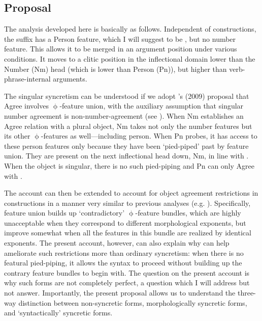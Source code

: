 \documentclass[output=paper,colorlinks,citecolor=brown,
]{langscibook}
\begin{document}
\subsection{Proposal}

The analysis developed here is basically as follows. Independent of \datnom constructions, the \sti suffix has a Person feature, which I will suggest to be , but no number feature. This allows it to be merged in an argument position under various conditions. %
It moves to a clitic position in the inflectional domain lower than the Number (Nm) head (which is lower than Person (Pn)), but higher than verb-phrase-internal arguments. 

The singular syncretism can be understood if we adopt \citeauthor{Kratzer:2009jq}'s (2009) proposal that Agree involves $\upphi$-feature union, with the auxiliary assumption that singular number agreement is non-number-agreement (see \citealt{Nevins2010:ab}). When Nm establishes an Agree relation with a plural object, Nm takes not only the number features but its other $\upphi$-features as well---including person. When Pn probes, it has access to these person features only because they have been `pied-piped' past \sti by feature union. They are present on the next inflectional head down, Nm, in line with  \cite{baker2010agreement}. When the object is singular, there is no such pied-piping and Pn can only Agree with \stin. 

 The account can then be extended to account for object agreement restrictions in \datnom constructions in a manner very similar to previous analyses (e.g. \citealt{DAlessandro:2003oy,Holmberg:2004gk,Schutze:2003mh,SigurTHsson:2008dm,Ussery:2009jd}). Specifically, feature union builds up `contradictory' $\upphi$-feature bundles, which are highly unacceptable when they correspond to different morphological exponents, but improve somewhat when all the features in this bundle are realized by identical exponents. The present account, however, can also explain why \sti can help ameliorate such restrictions more than ordinary syncretism: when there is no featural pied-piping, it allows the syntax to proceed without building up the contrary feature bundles to begin with. The question on the present account is why such forms are not completely perfect, a question which I will address but not answer. Importantly, the present proposal allows us to understand the three-way distinction between non-syncretic forms, morphologically syncretic forms, and `syntactically' syncretic forms. 
\end{document}

